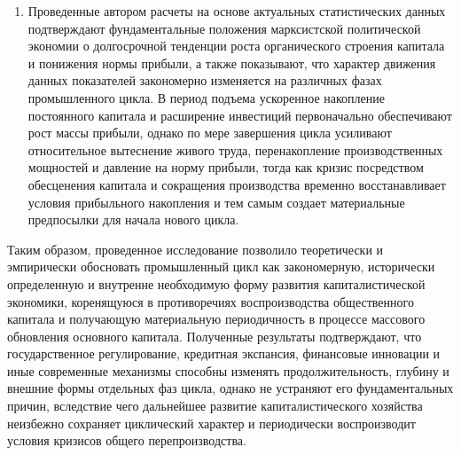 \begin{enumerate}
    \item Проведенные автором расчеты на основе актуальных статистических данных подтверждают фундаментальные положения марксистской политической экономии о долгосрочной тенденции роста органического строения капитала и понижения нормы прибыли, а также показывают, что характер движения данных показателей закономерно изменяется на различных фазах промышленного цикла. В период подъема ускоренное накопление постоянного капитала и расширение инвестиций первоначально обеспечивают рост массы прибыли, однако по мере завершения цикла усиливают относительное вытеснение живого труда, перенакопление производственных мощностей и давление на норму прибыли, тогда как кризис посредством обесценения капитала и сокращения производства временно восстанавливает условия прибыльного накопления и тем самым создает материальные предпосылки для начала нового цикла.
\end{enumerate}

Таким образом, проведенное исследование позволило теоретически и эмпирически обосновать промышленный цикл как закономерную, исторически определенную и внутренне необходимую форму развития капиталистической экономики, коренящуюся в противоречиях воспроизводства общественного капитала и получающую материальную периодичность в процессе массового обновления основного капитала. Полученные результаты подтверждают, что государственное регулирование, кредитная экспансия, финансовые инновации и иные современные механизмы способны изменять продолжительность, глубину и внешние формы отдельных фаз цикла, однако не устраняют его фундаментальных причин, вследствие чего дальнейшее развитие капиталистического хозяйства неизбежно сохраняет циклический характер и периодически воспроизводит условия кризисов общего перепроизводства.
